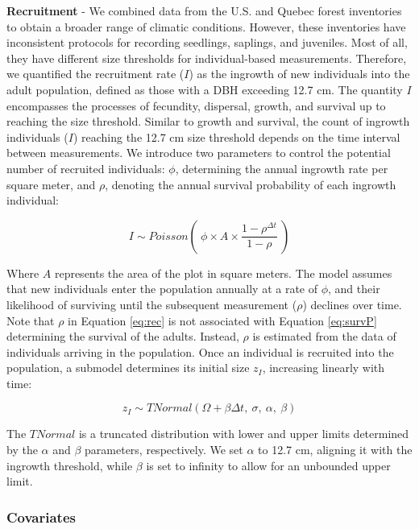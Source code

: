 \documentclass[12pt]{article}
\begin{document}
\textbf{Recruitment} - We combined data from the U.S. and Quebec forest
inventories to obtain a broader range of climatic conditions. However,
these inventories have inconsistent protocols for recording seedlings,
saplings, and juveniles. Most of all, they have different size
thresholds for individual-based measurements. Therefore, we quantified
the recruitment rate (\(I\)) as the ingrowth of new individuals into the
adult population, defined as those with a DBH exceeding 12.7 cm. The
quantity \(I\) encompasses the processes of fecundity, dispersal,
growth, and survival up to reaching the size threshold. Similar to
growth and survival, the count of ingrowth individuals (\(I\)) reaching
the 12.7 cm size threshold depends on the time interval between
measurements. We introduce two parameters to control the potential
number of recruited individuals: \(\phi\), determining the annual
ingrowth rate per square meter, and \(\rho\), denoting the annual
survival probability of each ingrowth individual:

\begin{equation}
  I \sim Poisson(~\phi \times A \times \frac{1 - \rho^{\Delta t}}{1-\rho}~)
\label{eq:rec}\end{equation}

Where \(A\) represents the area of the plot in square meters. The model
assumes that new individuals enter the population annually at a rate of
\(\phi\), and their likelihood of surviving until the subsequent
measurement (\(\rho\)) declines over time. Note that \(\rho\) in
Equation \ref{eq:rec} is not associated with Equation \ref{eq:survP}
determining the survival of the adults. Instead, \(\rho\) is estimated
from the data of individuals arriving in the population. Once an
individual is recruited into the population, a submodel determines its
initial size \(z_I\), increasing linearly with time:

\begin{equation}
  z_{I} \sim TNormal(\Omega + \beta \Delta t,~\sigma, ~ \alpha, ~ \beta)
\label{eq:recSize}\end{equation}

The \(TNormal\) is a truncated distribution with lower and upper limits
determined by the \(\alpha\) and \(\beta\) parameters, respectively. We
set \(\alpha\) to 12.7 cm, aligning it with the ingrowth threshold,
while \(\beta\) is set to infinity to allow for an unbounded upper
limit.

\hypertarget{covariates}{%
\subsubsection{Covariates}\label{covariates}}
\end{document}
